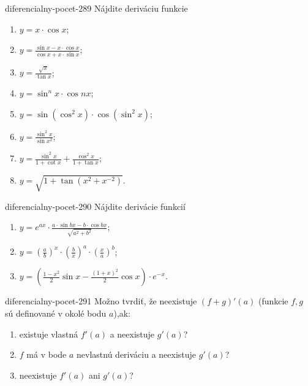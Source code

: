 \begin{defproblem}{diferencialny-pocet-289}
Nájdite deriváciu funkcie
\begin{multicols}{2}
\begin{enumerate}
    \item $y=x\cdot\cos x$;
    \item $y=\frac{\sin x-x\cdot\cos x}{\cos x+x\cdot\sin x}$;
    \item $y=\frac{\sqrt{x}}{\tan x}$;
    \item $y=\sin^n x\cdot\cos nx$;
    \item $y=\sin (\cos^2 x)\cdot \cos (\sin^2 x)$;
    \item $y=\frac{\sin^2 x}{\sin x^2}$;
    \item $y=\frac{\sin^2 x}{1+\cot x}+\frac{\cos^2 x}{1+\tan x}$;
    \item $y=\sqrt{1+\tan (x^2+x^{-2})}$.
\end{enumerate}
\end{multicols}
\end{defproblem}

\begin{defproblem}{diferencialny-pocet-290}
Nájdite derivácie funkcií
\begin{enumerate}
\item $y = e^{ax} \cdot \frac{a \cdot \sin{bx} - b \cdot \cos{bx}}{\sqrt{a^2+b^2}}$;
\item $y = (\frac{a}{b})^x \cdot (\frac{b}{x})^a \cdot (\frac{x}{a})^b$;
\item $y = (\frac{1-x^2}{2} \sin{x} - \frac{(1+x)^2}{2} \cos{x}) \cdot e^{-x}$.
\end{enumerate}
\end{defproblem}

\begin{defproblem}{diferencialny-pocet-291}
Možno tvrdiť, že neexistuje $(f+g)'(a)$ (funkcie $f,g$ sú definované v okolé bodu $a$),ak:
\begin{enumerate}
\item existuje vlastná $f'(a)$ a neexistuje $g'(a)$?
\item $f$ má v bode $a$ nevlastnú deriváciu a neexistuje $g'(a)$?
\item neexistuje $f'(a)$ ani $g'(a)$?
\end{enumerate}
\end{defproblem}

